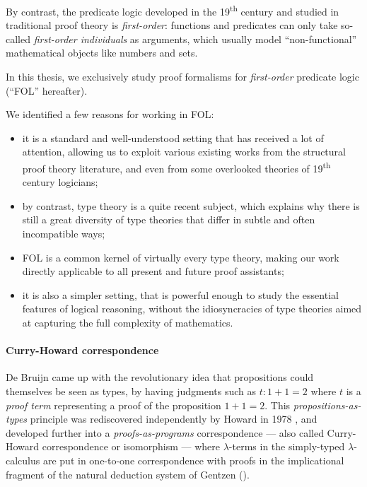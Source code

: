 By contrast, the predicate logic developed in the 19\textsuperscript{th} century
and studied in traditional proof theory is \emph{first-order}: functions and
predicates can only take so-called \emph{first-order individuals} as arguments,
which usually model ``non-functional'' mathematical objects like numbers and
sets.

\begin{emphpar}
In this thesis, we exclusively study proof formalisms for \emph{first-order}
predicate logic (``FOL'' hereafter).
\end{emphpar}

We identified a few reasons for working in FOL:
\begin{itemize}
  \item it is a standard and well-understood setting that has received a lot of
  attention, allowing us to exploit various existing works from the structural
  proof theory literature, and even from some overlooked theories of
  19\textsuperscript{th} century logicians;
  \item by contrast, type theory is a quite recent subject, which explains why there is still a
  great diversity of type theories that differ in subtle and often incompatible
  ways;
  \item FOL is a common kernel of virtually every type theory, making our work
  directly applicable to all present and future proof assistants;
  \item it is also a simpler setting, that is powerful enough to study the
  essential features of logical reasoning, without the idiosyncracies of type
  theories aimed at capturing the full complexity of mathematics.
\end{itemize}

\paragraph{Curry-Howard correspondence}

De Bruijn came up with the revolutionary idea that propositions could themselves
be seen as types, by having judgments such as $t : 1 + 1 = 2$ where $t$ is a
\emph{proof term} representing a proof of the proposition $1 + 1 = 2$. This
\emph{propositions-as-types} principle was rediscovered independently by Howard
in 1978 , and developed further into a
\emph{proofs-as-programs} correspondence --- also called Curry-Howard
correspondence or isomorphism --- where
$\lambda$-terms in the simply-typed $\lambda$-calculus are put in one-to-one
correspondence with proofs in the implicational fragment of the natural
deduction system  of Gentzen ().

